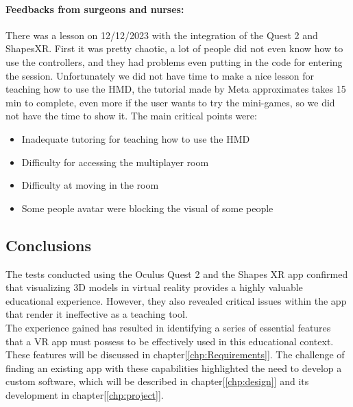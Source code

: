 \paragraph{Feedbacks from surgeons and nurses:}
There was a lesson on 12/12/2023 with the integration of the Quest 2 and ShapesXR. First it was pretty chaotic, a lot of people did not even know how to use the controllers,
and they had problems even putting in the code for entering the session. Unfortunately we did not have time to make a nice lesson for teaching how to use the HMD,
the tutorial made by Meta approximates takes 15 min to complete, even more if the user wants to try the mini-games, so we did not have the time to show it. The main critical points were: 


\begin{itemize}
  \item Inadequate tutoring for teaching how to use the \ac{HMD}
  \item Difficulty for accessing the multiplayer room
  \item Difficulty at moving in the room
  \item Some people avatar were blocking the visual of some people
\end{itemize}

\subsection{Conclusions}
\noindent
The tests conducted using the Oculus Quest 2 and the Shapes XR app confirmed that visualizing 3D models in virtual reality provides a highly valuable educational experience.
However, they also revealed critical issues within the app that render it ineffective as a teaching tool.\\
The experience gained has resulted in identifying a series of essential features that a VR app must possess to be effectively used in this educational context.
These features will be discussed in chapter[\ref{chp:Requirements}]. The challenge of finding an existing app with these capabilities highlighted the need to develop a custom software, which will be described in chapter[\ref{chp:design}] and its development in chapter[\ref{chp:project}].
